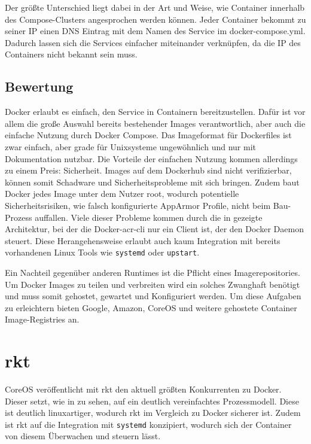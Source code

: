 Der größte Unterschied liegt dabei in der Art und Weise, wie Container innerhalb des Compose-Clusters angesprochen werden können. Jeder Container bekommt zu seiner IP einen DNS Eintrag mit dem Namen des Service im docker-compose.yml. Dadurch lassen sich die Services einfacher miteinander verknüpfen, da die IP des Containers nicht bekannt sein muss.

\subsection{Bewertung}
\label{sec:compDockerBewertung}
Docker erlaubt es einfach, den Service in Containern bereitzustellen. Dafür ist vor allem die große Auswahl bereits bestehender Images verantwortlich, aber auch die einfache Nutzung durch Docker Compose. Das Imageformat für Dockerfiles ist zwar einfach, aber grade für Unixsysteme ungewöhnlich und nur mit Dokumentation nutzbar. Die Vorteile der einfachen Nutzung kommen allerdings zu einem Preis: Sicherheit. Images auf dem Dockerhub sind nicht verifizierbar, können somit Schadware und Sicherheitsprobleme mit sich bringen. Zudem baut Docker jedes Image unter dem Nutzer root, wodurch potentielle Sicherheitsrisiken, wie falsch konfigurierte AppArmor Profile, nicht beim Bau-Prozess auffallen. Viele dieser Probleme kommen durch die in  gezeigte Architektur, bei der die Docker-\gls{acr-cli} nur ein Client ist, der den Docker Daemon steuert. Diese Herangehensweise erlaubt auch kaum Integration mit bereits vorhandenen Linux Tools wie \texttt{systemd} oder \texttt{upstart}.

Ein Nachteil gegenüber anderen Runtimes ist die Pflicht eines Imagerepositories. Um Docker Images zu teilen und verbreiten wird ein solches Zwanghaft benötigt und muss somit gehostet, gewartet und Konfiguriert werden. Um diese Aufgaben zu erleichtern bieten Google, Amazon, CoreOS und weitere gehostete Container Image-Registries an.

\section{rkt}
\label{sec:compRkt}

CoreOS veröffentlicht mit rkt den aktuell größten Konkurrenten zu Docker. Dieser setzt, wie in  zu sehen, auf ein deutlich vereinfachtes Prozessmodell. Diese ist deutlich linuxartiger, wodurch rkt im Vergleich zu Docker sicherer ist. Zudem ist rkt auf die Integration mit \texttt{systemd} konzipiert, wodurch sich der Container von diesem Überwachen und steuern lässt.

